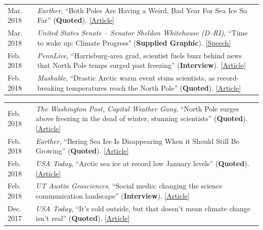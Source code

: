 \documentclass[margin,line,palatino,courier,10pt]{res}
\begin{document}
\begin{resume}
\begin{tabular}{@{}p{0.9in}p{4in}}
Mar. 2018 & \textit{Earther}, ``Both Poles Are Having a Weird, Bad Year For Sea Ice So Far'' (\textbf{Quoted}). \href{https://earther.com/both-poles-are-having-a-weird-bad-year-for-sea-ice-so-1824074352}{[Article]}\\
Mar. 2018 & \textit{United States Senate -- Senator Sheldon Whitehouse (D--RI)}, ``Time to wake up: Climate Progress" (\textbf{Supplied Graphic}). \href{https://www.youtube.com/watch?v=C_E5OQgt2SE}{[Speech]}\\
Feb. 2018 & \textit{PennLive}, ``Harrisburg-area grad, scientist fuels buzz behind news that North Pole temps surged past freezing'' (\textbf{Interview}). \href{http://www.pennlive.com/news/2018/02/harrisburg-area_scientist_is_b.html}{[Article]}\\
Feb. 2018 & \textit{Mashable}, ``Drastic Arctic warm event stuns scientists, as record-breaking temperatures reach the North Pole'' (\textbf{Quoted}). \href{https://mashable.com/2018/02/26/arctic-heat-wave-north-pole-february-sea-ice/?utm_cid=hp-h-2#jZ.Ip1wPjkqD}{[Article]}\\
\end{tabular}
\begin{tabular}{@{}p{0.9in}p{4in}}
Feb. 2018 & \textit{The Washington Post, Capital Weather Gang}, ``North Pole surges above freezing in the dead of winter, stunning scientists'' (\textbf{Quoted}). \href{https://www.washingtonpost.com/news/capital-weather-gang/wp/2018/02/26/north-pole-surges-above-freezing-in-the-dead-of-winter-stunning-scientists/?utm_term=.6025384d6bf1}{[Article]}\\
Feb. 2018 & \textit{Earther}, ``Bering Sea Ice Is Disappearing When it Should Still Be Growing'' (\textbf{Quoted}). \href{https://earther.com/bering-sea-ice-is-disappearing-at-a-time-when-it-should-1823193914}{[Article]}\\
Feb. 2018 & \textit{USA Today}, ``Arctic sea ice at record low January levels'' (\textbf{Quoted}). \href{https://www.usatoday.com/story/weather/2018/02/20/arctic-sea-ice-record-low-january-levels/355738002/}{[Article]}\\
Feb. 2018 & \textit{UT Austin Geosciences}, ``Social media: changing the science communication landscape'' (\textbf{Interview}). \href{https://www.jsg.utexas.edu/science-yall/social-media-landscape/}{[Article]}\\
Dec. 2017 & \textit{USA Today}, ``It's cold outside, but that doesn't mean climate change isn't real'' (\textbf{Quoted}). \href{https://www.usatoday.com/story/weather/2017/12/28/its-cold-outside-but-doesnt-mean-climate-change-isnt-real/987948001/}{[Article]}\\

\end{tabular}
\end{resume}
\end{document}
